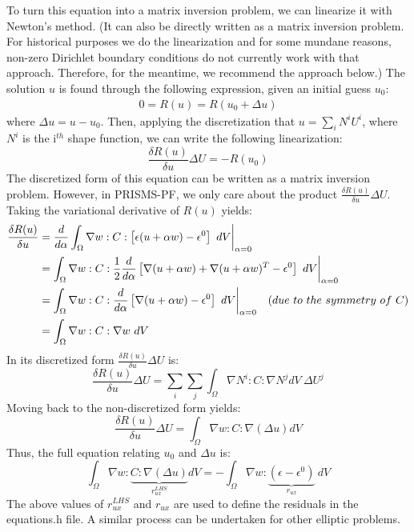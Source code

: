 \documentclass[10pt]{article} %
\begin{document}
To turn this equation into a matrix inversion problem, we can linearize it with Newton's method. (It can also be directly written as a matrix inversion problem. For historical purposes we do the linearization and for some mundane reasons, non-zero Dirichlet boundary conditions do not currently work with that approach. Therefore, for the meantime, we recommend the approach below.) The solution $u$ is found through the following expression, given an initial guess $u_0$: 
\begin{gather}
0 = R(u) = R(u_0 + \Delta u)
\end{gather}
where $\Delta u = u - u_0$. Then, applying the discretization that $u = \sum_i N^i U^i$, where $N^i$ is the i$^{th}$ shape function, we can write the following linearization:
\begin{equation}
\frac{\delta R(u)}{\delta u} \Delta U = -R(u_0) \label{matrix_eqn}
\end{equation}
The discretized form of this equation can be written as a matrix inversion problem. However, in PRISMS-PF, we only care about the product $\frac{\delta R(u)}{\delta u} \Delta U$. Taking the variational derivative of $R(u)$ yields:
\begin{align}
\frac{\delta R(u)}{\delta u} &= \frac{d}{d\alpha} \int_{\Omega}   \nabla w :C: \left[ \epsilon (u+\alpha w) - \epsilon^0 \right] ~dV  \bigg{|}_{\alpha=0} \\
&=  \int_{\Omega}   \nabla w :C: \frac{1}{2}\frac{d}{d\alpha}\left[ \nabla(u+\alpha w) + \nabla(u+\alpha w)^T  - \epsilon^0\right] ~dV \bigg{|}_{\alpha=0}\\
&= \int_{\Omega}   \nabla w :C: \frac{d}{d\alpha} \left[ \nabla(u+\alpha w) - \epsilon^0 \right]  ~dV \bigg{|}_{\alpha=0} \quad (due ~to ~the ~symmetry ~of ~C) \\
&= \int_{\Omega}   \nabla w :C: \nabla w  ~dV 
\end{align}
In its discretized form $\frac{\delta R(u)}{\delta u} \Delta U$ is:
\begin{equation}
\frac{\delta R(u)}{\delta u} \Delta U = \sum_i \sum_j \int_{\Omega} \nabla N^i : C : \nabla N^j dV ~\Delta U^j
\end{equation}
Moving back to the non-discretized form yields:
\begin{equation}
\frac{\delta R(u)}{\delta u} \Delta U = \int_{\Omega} \nabla w : C : \nabla (\Delta u) dV
\end{equation}
Thus, the full equation relating $u_0$ and $\Delta u$ is:
\begin{equation}
\int_{\Omega} \nabla w : \underbrace{C : \nabla (\Delta u)}_{r_{ux}^{LHS}} dV = -\int_{\Omega}   \nabla w : \underbrace{(\epsilon-\epsilon^0)}_{r_{ux}} ~dV
\end{equation}
The above values of $r_{ux}^{LHS}$ and $r_{ux}$ are used to define the residuals in the equations.h file. A similar process can be undertaken for other elliptic problems.
\end{document}

